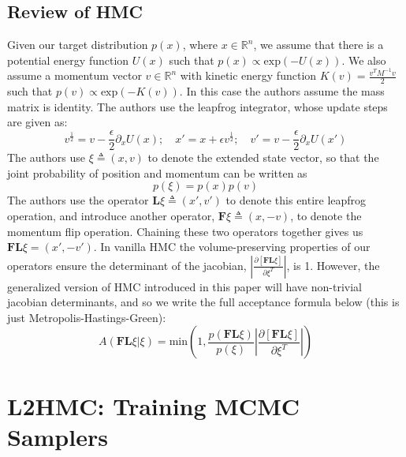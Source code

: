\documentclass[twoside]{article}
\begin{document}
\subsection{Review of HMC}
Given our target distribution $p(x)$, where $x \in \mathbb{R}^n$, we assume that there is a potential energy function $U(x)$ such that $p(x) \propto \text{exp}(-U(x))$. We also assume a momentum vector $v \in \mathbb{R}^n$ with kinetic energy function $K(v) = \frac{v^TM^{-1}v}{2}$ such that $p(v) \propto \text{exp}(-K(v))$. In this case the authors assume the mass matrix is identity. 
The authors use the leapfrog integrator, whose update steps are given as:
\begin{equation}
    v^{\frac{1}{2}} = v - \frac{\epsilon}{2} \partial_x U(x); \quad x' = x + \epsilon v^{\frac{1}{2}}; \quad v' = v- \frac{\epsilon}{2} \partial_x U(x')
\end{equation}
The authors use $\xi \triangleq (x,v)$ to denote the extended state vector, so that the joint probability of position and momentum can be written as
\begin{equation}
    p(\xi) = p(x)p(v)
\end{equation}
The authors use the operator $\textbf{L}\xi \triangleq (x',v')$ to denote this entire leapfrog operation, and introduce another operator, $\textbf{F}\xi \triangleq (x,-v)$, to denote the momentum flip operation. Chaining these two operators together gives us $\textbf{FL}\xi = (x',-v')$. In vanilla HMC the volume-preserving properties of our operators ensure the determinant of the jacobian, $\left| \frac{\partial[\textbf{FL}\xi]}{\partial \xi^T}\right|$, is 1. However, the generalized version of HMC introduced in this paper will have non-trivial jacobian determinants, and so we write the full acceptance formula below (this is just Metropolis-Hastings-Green):
\begin{equation*}
    A(\textbf{FL}\xi | \xi) = \text{min} \left( 1, \frac{p(\textbf{FL}\xi)}{p(\xi)}\left| \frac{\partial[\textbf{FL}\xi]}{\partial \xi^T}\right|\right)
\end{equation*}


\section{L2HMC: Training MCMC Samplers}
\end{document}
